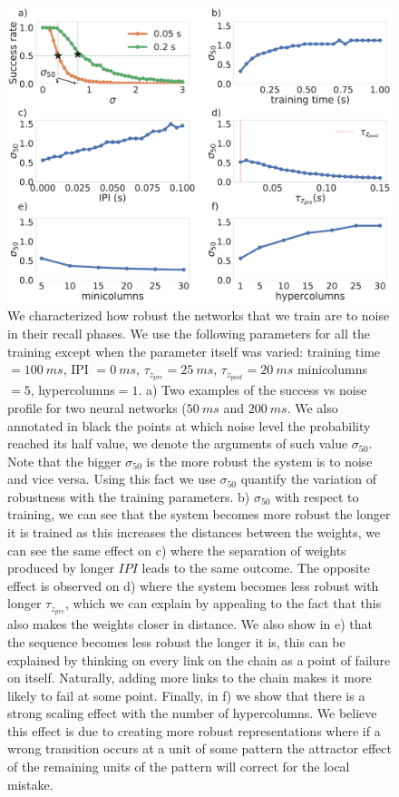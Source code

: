 \documentclass[10pt,a4paper]{article}
\begin{document}
\begin{figure}[H]
\centering
\includegraphics[scale=0.20]{noise_robustness.pdf}
\caption{We characterized  how robust the networks that we train are to noise in their recall phases.  We use the following parameters for all the training except when the parameter itself was varied: training time $= 100 \: ms$, IPI $= 0 \: ms$, $\tau_{z_{pre}} = 25 \: ms$, $\tau_{z_{post}} = 20 \: ms$ minicolumns $=5$, hypercolumns$=1$. a) Two examples of the success vs noise profile for two neural networks ($50 \: ms$ and $200 \: ms$. We also annotated in black the points at which noise level the probability reached its half value, we denote the arguments of such value $\sigma_{50}$. Note that the bigger $\sigma_{50}$ is the more robust the system is to noise and vice versa. Using this fact we use $\sigma_{50}$ quantify the variation of robustness with the training parameters. b) $\sigma_{50}$ with respect to training, we can see that the system becomes more robust the longer it is trained as this increases the distances between the weights, we can see the same effect on c) where the separation of weights produced by longer $IPI$ leads to the same outcome. The opposite effect is observed on d) where the system becomes less robust with longer $\tau_{z_{pre}}$, which we can explain by appealing to the fact that this also makes the weights closer in distance. We also show in e) that the sequence becomes less robust the longer it is, this can be explained by thinking on every link on the chain as a point of failure on itself. Naturally, adding more links to the chain makes it more likely to fail at some point. Finally, in f) we show that there is a strong scaling effect with the number of hypercolumns. We believe this effect is due to creating more robust representations where if a wrong transition occurs at a unit of some pattern the attractor effect of the remaining units of the pattern will correct for the local mistake.}
\label{fig:noise_sensitivity}
\end{figure}
\end{document}
